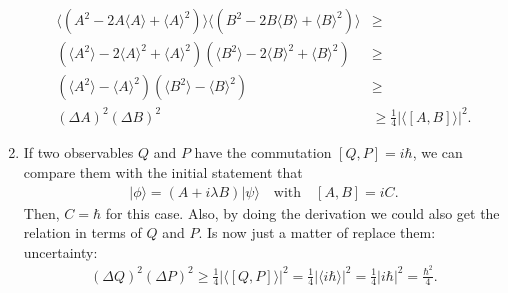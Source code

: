 \documentclass[letterpaper,11pt,twoside]{article}
\newcommand{\ket}[1]{|#1\rangle}
\newcommand{\braket}[1]{\langle#1\rangle}
\begin{document}
\begin{enumerate}[itemsep=0pt,topsep=0pt,label=(\alph*)]
\begin{align*}
    \braket{(A^2-2A\braket{A}+\braket{A}^2)}\braket{(B^2-2B\braket{B}+\braket{B}^2)}&\geq\\
    \left(\braket{A^2}-2\braket{A}^2+\braket{A}^2\right)\left(\braket{B^2}-2\braket{B}^2+\braket{B}^2\right)&\geq\\
    \left(\braket{A^2}-\braket{A}^2\right)\left(\braket{B^2}-\braket{B}^2\right)&\geq\\
    (\Delta A)^2(\Delta B)^2&\geq\frac{1}{4}|\braket{[A,B]}|^2.
  \end{align*}
  \item If two observables $Q$ and $P$ have the commutation $[Q,P]=i\hbar$, we can compare them with the initial statement that 
  \begin{align*}
    \ket{\phi}=(A+i\lambda B)\ket{\psi}\quad\text{with}\quad [A,B]=iC.
  \end{align*}
  Then, $C=\hbar$ for this case. Also, by doing the derivation we could also get the relation in terms of $Q$ and $P$. Is now just a matter of replace them:
  uncertainty:  
  \begin{align*}
    (\Delta Q)^2(\Delta P)^2\geq\frac{1}{4}|\braket{[Q,P]}|^2=\frac{1}{4}|\braket{i\hbar}|^2=\frac{1}{4}|i\hbar|^2=\frac{\hbar^2}{4}.
  \end{align*}
\end{enumerate}
\end{document}
